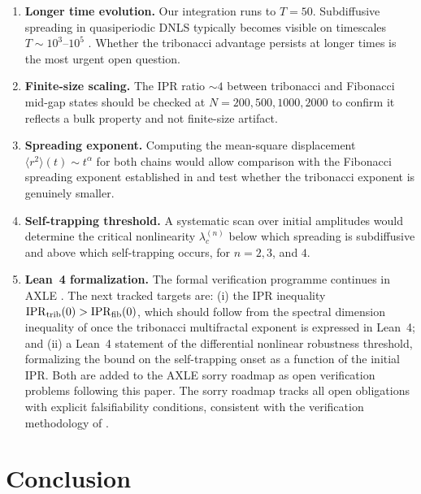 \documentclass[12pt,a4paper]{article}
\begin{document}
\begin{enumerate}

\item \textbf{Longer time evolution.} Our integration runs to $T = 50$.
Subdiffusive spreading in quasiperiodic DNLS typically becomes visible on
timescales $T \sim 10^3$--$10^5$ \cite{Flach2010}. Whether the tribonacci
advantage persists at longer times is the most urgent open question.

\item \textbf{Finite-size scaling.} The IPR ratio $\sim 4$ between tribonacci
and Fibonacci mid-gap states should be checked at $N = 200, 500, 1000, 2000$
to confirm it reflects a bulk property and not finite-size artifact.

\item \textbf{Spreading exponent.} Computing the mean-square displacement
$\langle r^2 \rangle(t) \sim t^{\alpha}$ for both chains would allow
comparison with the Fibonacci spreading exponent established in
\cite{Lahini2009} and test whether the tribonacci exponent is genuinely
smaller.

\item \textbf{Self-trapping threshold.} A systematic scan over initial
amplitudes would determine the critical nonlinearity $\lambda_c^{(n)}$
below which spreading is subdiffusive and above which self-trapping occurs,
for $n = 2, 3$, and $4$.

\item \textbf{Lean~4 formalization.} The formal verification programme
continues in AXLE \cite{AXLE2026}. The next tracked targets are: (i) the
IPR inequality $\mathrm{IPR}_{\rm trib}(0) > \mathrm{IPR}_{\rm fib}(0)$,
which should follow from the spectral dimension inequality of
\cite{Krebbekx2023} once the tribonacci multifractal exponent is expressed
in Lean~4; and (ii) a Lean~4 statement of the differential nonlinear
robustness threshold, formalizing the bound on the self-trapping onset as a
function of the initial IPR. Both are added to the AXLE sorry roadmap as
open verification problems following this paper. The sorry roadmap tracks
all open obligations with explicit falsifiability conditions, consistent with
the verification methodology of \cite{AXLE2026}.

\end{enumerate}

\section{Conclusion}
\end{document}
